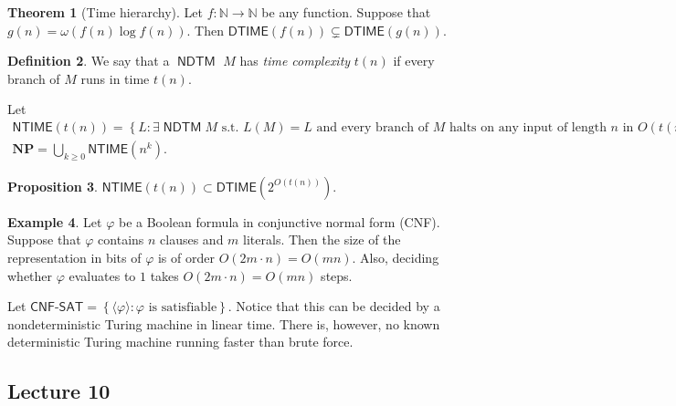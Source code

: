 \documentclass[10pt,letterpaper,cm]{nupset}
\theoremstyle{definition}
\newtheorem{definition}{Definition}[subsection]
\newtheorem{exmp}[definition]{Example}
\theoremstyle{theorem}
\newtheorem{theorem}[definition]{Theorem}
\newtheorem{prop}[definition]{Proposition}
\theoremstyle{remark}
\newcommand{\N}{\mathbb N}
\newcommand{\1}{\mathbf{1}}
\newcommand{\0}{\vec 0}
\DeclareMathOperator{\NDTM}{\mathsf{NDTM}}
\begin{document}
\begin{theorem}[Time hierarchy]
Let $f: \N \to \N$ be any function. Suppose that $g(n) = \omega(f(n) \log{f(n)})$. Then $\mathsf{DTIME}(f(n)) \subsetneq \mathsf{DTIME}(g(n))$.
\end{theorem}

\begin{definition}
We say that a $\NDTM$ $M$ has \textit{time complexity} $t(n)$ if every branch of $M$ runs in time $t(n)$. 
\end{definition}

\smallskip

Let  
\begin{gather*}
\mathsf{NTIME}(t(n)) = \left\{ L : \exists \NDTM M \text{ s.t. }L(M) = L \text{ and every branch of }M\text{ halts on any input of length }n\text{ in }O(t(n))\text{ steps}\right\} \\ 
\mathbf{NP} = \bigcup_{k \geq 0} \mathsf{NTIME}(n^k).
\end{gather*} 

\begin{prop}
$\mathsf{NTIME}(t(n)) \subset \mathsf{DTIME}(2^{O(t(n))})$.
\end{prop}

\begin{exmp}
Let $\varphi$ be a Boolean formula in conjunctive normal form (CNF). Suppose that $\varphi$ contains $n$ clauses and $m$ literals. Then the size of the representation in bits of $\varphi$ is of order $O(2 m \cdot n) = O(mn)$. Also, deciding whether $\varphi$ evaluates to $1$ takes  $O(2 m \cdot n) = O(mn)$ steps. 

Let $\mathsf{CNF\text{-}SAT} = \left\{\langle \varphi \rangle : \varphi \text{ is satisfiable}\right\}$. Notice that this can be decided by a nondeterministic Turing machine in linear time.  There is, however, no known deterministic Turing machine running faster than brute force. 
\end{exmp}

\subsection{Lecture 10}
\end{document}
